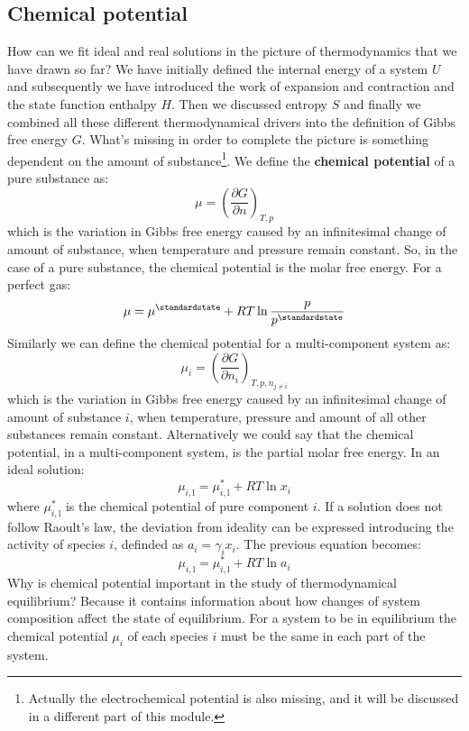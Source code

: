 \documentclass[12pt,a4paper]{report}
\begin{document}
   \subsection*{Chemical potential}
   How can we fit ideal and real solutions in the picture of thermodynamics that we have drawn so far? We have initially defined the internal energy of a system $U$ and subsequently we have introduced the work of expansion and contraction and the state function enthalpy $H$. Then we discussed entropy $S$ and finally we combined all these different thermodynamical drivers into the definition of Gibbs free energy $G$. What's missing in order to complete the picture is something dependent on the amount of substance\footnote{Actually the electrochemical potential is also missing, and it will be discussed in a different part of this module.}. We define the \textbf{chemical potential} of a pure substance as:
   \begin{equation*}
   \mu = \left(\frac{\partial G}{\partial n}\right)_{T,p}
   \end{equation*}
   which is the variation in Gibbs free energy caused by an infinitesimal change of amount of substance, when temperature and pressure remain constant. So, in the case of a pure substance, the chemical potential is the molar free energy.
   For a perfect gas:
   \begin{equation*}
   \mu =\mu^{\standardstate}+RT\ln\frac{p}{p^{\standardstate}} 
   \end{equation*}
   Similarly we can define the chemical potential for a multi-component system as:
   \begin{equation*}
   \mu_{i} = \left(\frac{\partial G}{\partial n_{i}}\right)_{T,p,n_{j\neq i}}
   \end{equation*}
   which is the variation in Gibbs free energy caused by an infinitesimal change of amount of substance $i$, when temperature, pressure and amount of all other substances remain constant. Alternatively we could say that the chemical potential, in a multi-component system, is the partial molar free energy.
   In an ideal solution: 
  \begin{equation*}
  \mu_{i,\mathrm{l}} =\mu^{*}_{i,\mathrm{l}}+RT\ln x_{i} 
  \end{equation*}
  where $\mu^{*}_{i,\mathrm{l}}$ is the chemical potential of pure component $i$.
  If a solution does not follow Raoult's law, the deviation from ideality can be expressed introducing the activity of species $i$, definded as $a_{i}=\gamma_{i} x_{i}$. The previous equation becomes:
  \begin{equation*}
  \mu_{i,\mathrm{l}} =\mu^{*}_{i,\mathrm{l}}+RT\ln a_{i} 
  \end{equation*}
  Why is chemical potential important in the study of thermodynamical equilibrium? Because it contains information about how changes of system composition affect the state of equilibrium. For a system to be in equilibrium the chemical potential $\mu_{i}$ of each species $i$ must be the same in each part of the system.
\end{document}
